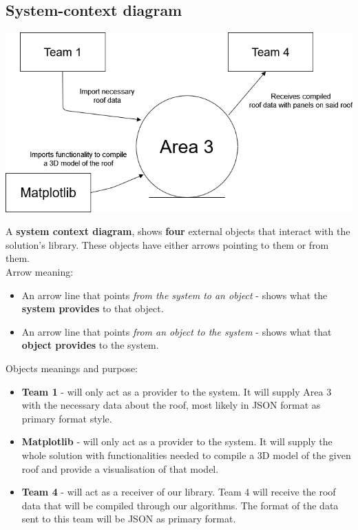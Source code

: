 \documentclass[a4paper,12pt,fleqn]{article}
\begin{document}
\subsection{System-context diagram}
\begin{center}
    \includegraphics[scale=0.6]{main/images/system-context-diagram.drawio.png}
\end{center}
A \textbf{system context diagram}, shows \textbf{four} external objects that interact
with the solution's library. These objects have either arrows pointing to them or from them.\\ Arrow meaning:
\begin{itemize}
    \item An arrow line that points \textit{from the system to an object} - shows
what the \textbf{system provides} to that object.
    \item An arrow line that points \textit{from an object to the
system} - shows what that \textbf{object provides} to the system.
\end{itemize}
Objects meanings and purpose:
\begin{itemize}
    \item \textbf{Team 1} - will only act as a provider to the system. It will supply Area 3 with the necessary data about the roof, most likely in JSON format as primary format style.
    \item \textbf{Matplotlib} - will only act as a provider to the system. It will supply the whole solution with functionalities needed to compile a 3D model of the given roof and provide a visualisation of that model.
    \item \textbf{Team 4} - will act as a receiver of our library. Team 4 will receive the roof data that will be compiled through our algorithms. The format of the data sent to this team will be JSON as primary format.
\end{itemize}
\end{document}
